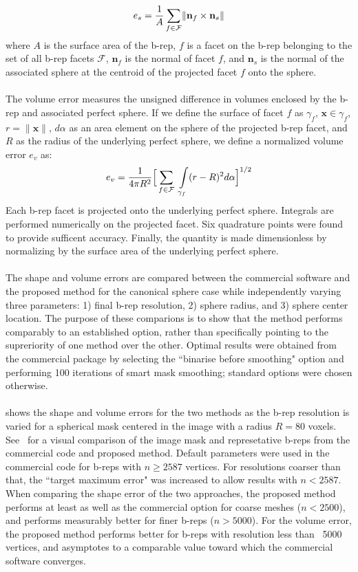 \begin{equation} 
	e_s = \frac{1}{A} \sum \limits_{f\in\mathcal{F}} \lVert {\bf n}_f \times {\bf n}_s \rVert
\end{equation}
where $A$ is the surface area of the b-rep, $f$ is a facet on the b-rep belonging to the set of all b-rep facets $\mathcal{F}$, ${\bm n}_f$ is the normal of facet $f$, and ${\bm n}_s$ is the normal of the associated sphere at the centroid of the projected facet $f$ onto the sphere. \\ \\
%
The volume error measures the unsigned difference in volumes enclosed by the b-rep and associated perfect sphere. If we define the surface of facet $f$ as $\gamma_f$,  ${\bm x} \in \gamma_f$, $r = \lVert {\bm x} \rVert$, $d\alpha$ as an area element on the sphere of the projected b-rep facet, and $R$ as the radius of the underlying perfect sphere, we define a normalized volume error $e_v$ as:
\begin{equation}
	e_v = \frac{1}{4\pi R^2} \Big[\sum \limits_{f \in \mathcal{F}\textsl{}} \ \int \limits_{\gamma_f} (r - R)^2 d\alpha \Big]^{1/2}
\end{equation}
Each b-rep facet is projected onto the underlying perfect sphere. Integrals are performed numerically on the projected facet. Six quadrature points were found to provide sufficent accuracy. Finally, the quantity is made dimensionless by normalizing by the surface area of the underlying perfect sphere.
\\ \\
%
The shape and volume errors are compared between the commercial software and the proposed method for the canonical sphere case while independently varying three parameters: 1) final b-rep resolution, 2) sphere radius, and 3) sphere center location. The purpose of these comparions is to show that the  method performs comparably to an established option, rather than specifically pointing to the supreriority of one method over the other. Optimal results were obtained from the commercial package by selecting the ``binarise before smoothing" option and performing 100 iterations of smart mask smoothing; standard options were chosen otherwise. \\ \\
%
 shows the shape and volume errors for the two methods as the b-rep resolution is varied for a spherical mask centered in the image with a radius $R = 80$ voxels. See~ for a visual comparison of the image mask and represetative b-reps from the commercial code and proposed method. Default parameters were used in the commercial code for b-reps with $n \ge 2587$ vertices. For resolutions coarser than that, the ``target maximum error" was increased to allow results with $n < 2587$. When comparing the shape error of the two approaches, the proposed method performs at least as well as the commercial option for coarse meshes ($n < 2500$), and performs measurably better for finer b-reps ($n > 5000$). For the volume error, the proposed method performs better for b-reps with resolution less than ~5000 vertices, and asymptotes to a comparable value toward which the commercial software converges.\\ \\

